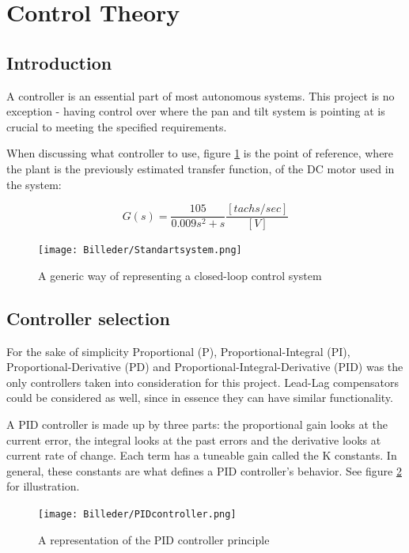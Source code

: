 \newpage

\section{Control Theory}
\subsection{Introduction}
A controller is an essential part of most autonomous systems. This project is no exception - having control over where the pan and tilt system is pointing at is crucial to meeting the specified requirements.

When discussing what controller to use, figure \ref{fig:Standartsystem} is the point of reference, where the plant is the previously estimated transfer function, of the DC motor used in the system:

\begin{equation}
G(s)=\frac{105}{0.009s^2+s} \frac{[tachs/sec]}{[V]}
\end{equation}

\begin{figure}[h!]
\centering
\texttt{[image: Billeder/Standartsystem.png]}
\caption{ A generic way of representing a closed-loop control system }
\label{fig:Standartsystem}
\end{figure}

\newpage

\subsection{Controller selection}
For the sake of simplicity Proportional (P), Proportional-Integral (PI), Proportional-Derivative (PD) and Proportional-Integral-Derivative (PID) was the only controllers taken into consideration for this project. Lead-Lag compensators could be considered as well, since in essence they can have similar functionality.\par

A PID controller is made up by three parts: the proportional gain looks at the current error, the integral looks at the past errors and the derivative looks at current rate of change. Each term has a tuneable gain called the K constants. In general, these constants are what defines a PID controller’s behavior. See figure \ref{fig:PID controller} for illustration. 

\begin{figure}[h!]
\centering
\texttt{[image: Billeder/PIDcontroller.png]}
\caption{ A representation of the PID controller principle }
\label{fig:PID controller}
\end{figure}

